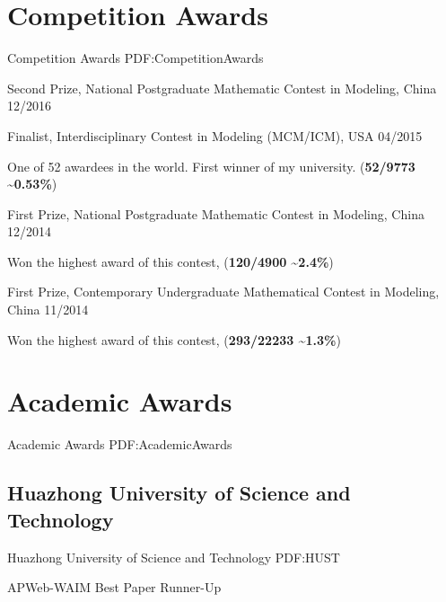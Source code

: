 \documentclass[letterpaper,10pt,oneside]{article}
\begin{document}
\begin{body}

\section
{Competition Awards}
{Competition Awards}
{PDF:CompetitionAwards}

\BulletItem
Second Prize, National Postgraduate Mathematic Contest in Modeling, China
\hfill
12/2016
\GapNoBreak

\BulletItem
Finalist, Interdisciplinary Contest in Modeling (MCM/ICM), USA
\hfill
04/2015
\begin{detail}
\SubItem
One of 52 awardees in the world. First winner of my university. (\textbf{52/9773 \textasciitilde0.53\%})
\end{detail}

\Gap
\BulletItem
First Prize, National Postgraduate Mathematic Contest in Modeling, China
\hfill
12/2014
\begin{detail}
\SubItem
Won the highest award of this contest, 
(\textbf{120/4900 \textasciitilde2.4\%}) 
\end{detail}

\Gap
\BulletItem
First Prize, Contemporary Undergraduate Mathematical Contest in Modeling, China
\hfill
11/2014
\begin{detail}
\SubItem
Won the highest award of this contest,
(\textbf{293/22233 \textasciitilde1.3\%})
\end{detail}


\section
{Academic Awards}
{Academic Awards}
{PDF:AcademicAwards}

\subsection
{Huazhong University of Science and Technology}
{Huazhong University of Science and Technology}
{PDF:HUST}
\GapNoBreak

\BulletItem
APWeb-WAIM Best Paper Runner-Up
\hfill
{}

\GapNoBreak


\end{body}
\end{document}
